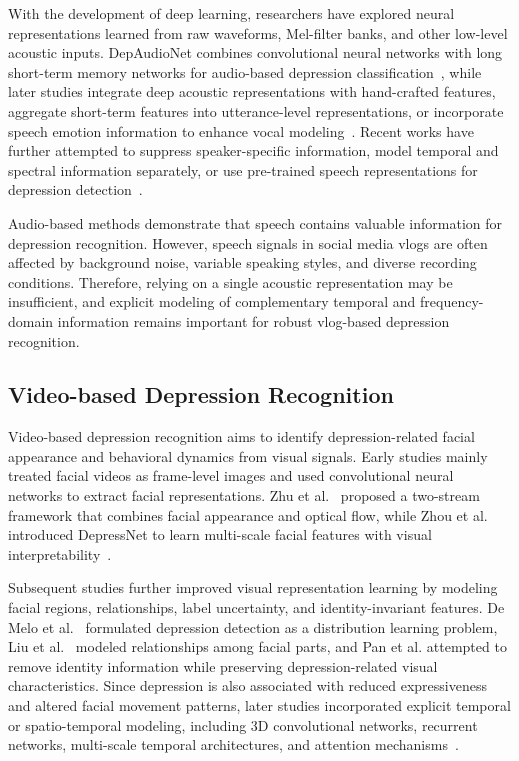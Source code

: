 \documentclass[a4paper,fleqn]{cas-dc}
\begin{document}
With the development of deep learning, researchers have explored neural representations learned from raw waveforms, Mel-filter banks, and other low-level acoustic inputs. DepAudioNet combines convolutional neural networks with long short-term memory networks for audio-based depression classification~\cite{research:audio_1}, while later studies integrate deep acoustic representations with hand-crafted features, aggregate short-term features into utterance-level representations, or incorporate speech emotion information to enhance vocal modeling~\cite{research:audio_2,research:audio_3,research:audio_4}. Recent works have further attempted to suppress speaker-specific information, model temporal and spectral information separately, or use pre-trained speech representations for depression detection~\cite{Pan2024MFDSVAN,Chen2025TTFNet,model:InterpSpeech}.

Audio-based methods demonstrate that speech contains valuable information for depression recognition. However, speech signals in social media vlogs are often affected by background noise, variable speaking styles, and diverse recording conditions. Therefore, relying on a single acoustic representation may be insufficient, and explicit modeling of complementary temporal and frequency-domain information remains important for robust vlog-based depression recognition.

\subsection{Video-based Depression Recognition}
Video-based depression recognition aims to identify depression-related facial appearance and behavioral dynamics from visual signals. Early studies mainly treated facial videos as frame-level images and used convolutional neural networks to extract facial representations. Zhu et al.~\cite{research:visual_1} proposed a two-stream framework that combines facial appearance and optical flow, while Zhou et al. introduced DepressNet to learn multi-scale facial features with visual interpretability~\cite{research:visual_2}.

Subsequent studies further improved visual representation learning by modeling facial regions, relationships, label uncertainty, and identity-invariant features. 
De Melo et al.~\cite{Melo2019Distribution} formulated depression detection as a distribution learning problem, 
Liu et al.~\cite{Liu2023PRANet} modeled relationships among facial parts, and Pan et al. \cite{Pan2024OpticalDR} attempted to remove identity information while preserving depression-related visual characteristics. Since depression is also associated with reduced expressiveness and altered facial movement patterns, later studies incorporated explicit temporal or spatio-temporal modeling, including 3D convolutional networks, recurrent networks, multi-scale temporal architectures, and attention mechanisms~\cite{Jazaery2018C3D,Melo2019GlobalLocalC3D,Azher2020BiLSTM,Melo2020Multiscale,He2021STFAM,Melo2021MDN,Niu2022SETOV,Li2025MemRank}.
\end{document}
